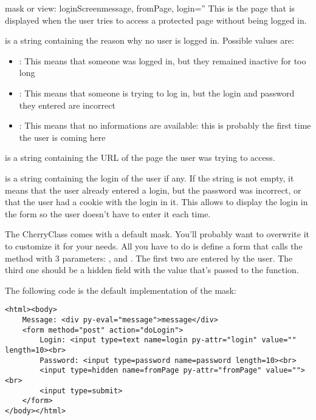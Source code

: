 \begin{funcdesc}{mask or view: loginScreen}{message, fromPage, login=''}
This is the page that is displayed when the user tries to access a protected page without being logged in.

 is a string containing the reason why no user is logged in. Possible values are:
\begin{itemize}
\item
{}: This means that someone was logged in, but they remained inactive for too long
\item
{}: This means that someone is trying to log in, but the login and password they
entered are incorrect
\item
{}: This means that no informations are available: this is probably the first time the
user is coming here
\end{itemize}

 is a string containing the URL of the page the user was trying to access.

 is a string containing the login of the user if any. If the string is not empty, it means that
 the user already entered a login, but the password was incorrect, or that the user had a cookie with the login in it.
This allows to display the login in the form so the user doesn't have to enter it each time.

The CherryClass comes with a default  mask. You'll probably want to overwrite it to customize it for
your needs. All you have to do is define a form that calls the  method with 3 parameters:
,  and . The first two are entered by the user. The third one should be a hidden
field with the value that's passed to the function.

The following code is the default implementation of the  mask:
\begin{verbatim}
<html><body>
    Message: <div py-eval="message">message</div>
    <form method="post" action="doLogin">
        Login: <input type=text name=login py-attr="login" value="" length=10><br>
        Password: <input type=password name=password length=10><br>
        <input type=hidden name=fromPage py-attr="fromPage" value=""><br>
        <input type=submit>
    </form>
</body></html>
\end{verbatim}
\end{funcdesc}

